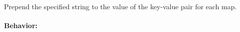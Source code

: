 Prepend the specified string to the value of the key-value pair for each map.

\paragraph{Behavior:}
\begin{itemize}[noitemsep]


\end{itemize}
